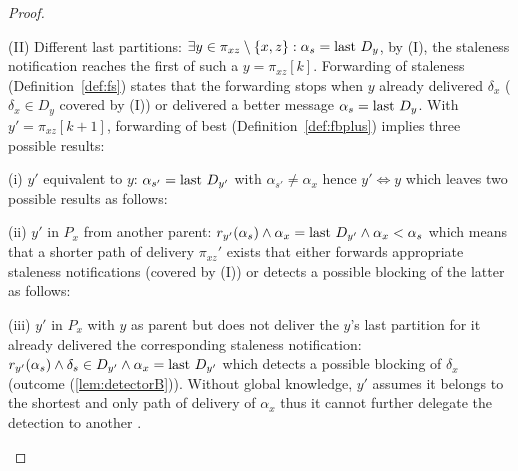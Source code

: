 \begin{proof}
\begin{asparadesc}
  \item[(II) Different last partitions:] $\exists y \in \pi_{xz}
    \setminus \{x, z\}: \alpha_s = \textup{last}~ D_y$, by (I), the staleness
    notification reaches the first of such a \process $y =
    \pi_{xz}[k]$.  Forwarding of staleness (Definition~\ref{def:fs})
    states that the forwarding stops when $y$ already delivered
    $\delta_x$ ($\delta_x \in D_y$ covered by (I)) or delivered a
    better message $\alpha_s = \textup{last}~ D_y$.  With $y'=\pi_{xz}[k+1]$,
    forwarding of best (Definition~\ref{def:fbplus}) implies three
    possible results:
  \begin{asparadesc}
  \item [(i) $y'$ equivalent to $y$:] $\alpha_{s'} = \textup{last}~ D_{y'}$
    with $\alpha_{s'} \neq \alpha_x$ hence $y' \iff y$ which leaves
    two possible results as follows:
  \item [(ii) $y'$ in $P_x$ from another parent:] $r_{y'}(\alpha_s)
    \wedge \alpha_x = \textup{last}~ D_{y'} \wedge \alpha_x < \alpha_s$ which
    means that a shorter path of delivery $\pi_{xz}'$ exists that
    either forwards appropriate staleness notifications (covered by
    (I)) or detects a possible blocking of the latter as follows:
  \item [(iii) $y'$ in $P_x$ with $y$ as parent] but does not deliver
    the $y$'s last partition for it already delivered the
    corresponding staleness notification: $r_{y'}(\alpha_s) \wedge
    \delta_s \in D_{y'} \wedge \alpha_x = \textup{last}~ D_{y'}$ which detects
    a possible blocking of $\delta_x$ (outcome
    (\ref{lem:detectorB})). Without global knowledge, $y'$ assumes it
    belongs to the shortest and only path of delivery of $\alpha_x$
    thus it cannot further delegate the detection to another \process.
  \end{asparadesc}
  \end{asparadesc}

\end{proof}
